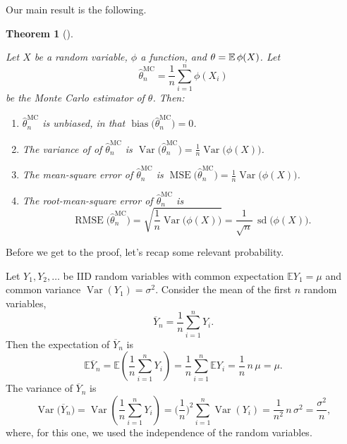 \documentclass[
  letterpaper,
  DIV=11,
  numbers=noendperiod]{scrreprt}
\theoremstyle{plain}
\newtheorem{theorem}{Theorem}[chapter]
\theoremstyle{definition}
\theoremstyle{definition}
\theoremstyle{remark}
\begin{document}
Our main result is the following.

\begin{theorem}[]\protect\hypertarget{thm-MCerr}{}\label{thm-MCerr}

Let \(X\) be a random variable, \(\phi\) a function, and
\(\theta = \operatorname{\mathbb{E}}\phi(X)\). Let
\[ \widehat{\theta}_n^{\mathrm{MC}} = \frac{1}{n} \sum_{i=1}^n \phi(X_i) \]
be the Monte Carlo estimator of \(\theta\). Then:

\begin{enumerate}
\def\labelenumi{\arabic{enumi}.}
\item
  \(\widehat{\theta}_n^{\mathrm{MC}}\) is unbiased, in that
  \(\operatorname{bias}\big(\widehat{\theta}_n^{\mathrm{MC}}\big) = 0\).
\item
  The variance of of \(\widehat{\theta}_n^{\mathrm{MC}}\) is
  \({\displaystyle \operatorname{Var}\big(\widehat{\theta}_n^{\mathrm{MC}}\big) = \frac{1}{n} \operatorname{Var}\big(\phi(X)\big)}\).
\item
  The mean-square error of \(\widehat{\theta}_n^{\mathrm{MC}}\) is
  \({\displaystyle \operatorname{MSE}\big(\widehat{\theta}_n^{\mathrm{MC}}\big) = \frac{1}{n} \operatorname{Var}\big(\phi(X)\big)}\).
\item
  The root-mean-square error of \(\widehat{\theta}_n^{\mathrm{MC}}\) is
  \[{\displaystyle \operatorname{RMSE}\big(\widehat{\theta}_n^{\mathrm{MC}}\big) = \sqrt{\frac{1}{n} \operatorname{Var}\big(\phi(X)\big)} = \frac{1}{\sqrt{n}} \, \operatorname{sd}\big(\phi(X)\big)}. \]
\end{enumerate}

\end{theorem}

Before we get to the proof, let's recap some relevant probability.

Let \(Y_1, Y_2, \dots\) be IID random variables with common expectation
\(\mathbb EY_1 = \mu\) and common variance
\(\operatorname{Var}(Y_1) = \sigma^2\). Consider the mean of the first
\(n\) random variables,
\[ \overline{Y}_n = \frac{1}{n} \sum_{i=1}^n Y_i . \] Then the
expectation of \(\overline{Y}_n\) is
\[ \mathbb E \overline{Y}_n = \mathbb E\left(\frac{1}{n}\sum_{i=1}^n Y_i\right) = \frac{1}{n} 
\sum_{i=1}^n \mathbb{E}Y_i = \frac{1}{n}\,n\,\mu = \mu . \] The variance
of \(\overline{Y}_n\) is
\[ \operatorname{Var}\big(  \overline{Y}_n \big)= \operatorname{Var} \left(\frac{1}{n}\sum_{i=1}^n Y_i\right) = \bigg(\frac{1}{n}\bigg)^2 
\sum_{i=1}^n \operatorname{Var}(Y_i) = \frac{1}{n^2}\,n\,\sigma^2 = \frac{\sigma^2}{n} , \]
where, for this one, we used the independence of the random variables.
\end{document}
